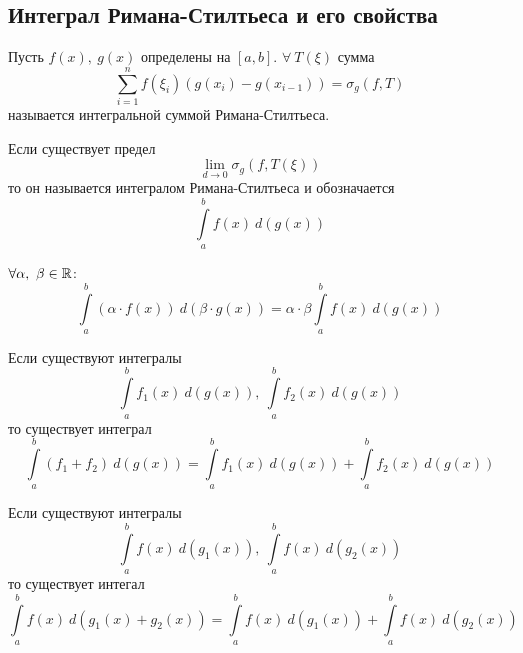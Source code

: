 \subsection{Интеграл Римана-Стилтьеса и его свойства}
\begin{definition}
    Пусть $f(x),\ g(x)$ определены на $[a,b]$. $\forall\ T(\xi)$ сумма 
    \[\sum\limits_{i=1}^{n} f(\xi_i)(g(x_i)-g(x_{i-1}))=\sigma_g(f,T)\]
    называется интегральной суммой Римана-Стилтьеса.
\end{definition} 
\begin{definition}
    Если существует предел
    \[\lim\limits_{d\to 0}\sigma_g(f, T(\xi))\]
    то он называется интегралом Римана-Стилтьеса и обозначается
    \[\int\limits_{a}^{b}f(x)\ d(g(x))\]
\end{definition}
\begin{numtheorem}
    $\forall \alpha,\ \beta\in \mathbb{R}$:
    \[\int\limits_{a}^{b}(\alpha\cdot f(x))\ d(\beta\cdot g(x))=\alpha \cdot \beta \int\limits_{a}^{b} f(x)\ d(g(x))\]
\end{numtheorem} 
\begin{numtheorem}
    Если существуют интегралы
    \[\int\limits_{a}^{b}f_1(x)\ d(g(x)),\ \int\limits_{a}^{b}f_2(x)\ d(g(x))\]
    то существует интеграл 
    \[\int\limits_{a}^{b}(f_1+f_2)\ d(g(x))=\int\limits_{a}^{b}f_1(x)\ d(g(x))+\int\limits_{a}^{b}f_2(x)\ d(g(x))\]
\end{numtheorem} 
\begin{numtheorem}
    Если существуют интегралы
    \[\int\limits_{a}^{b}f(x)\ d(g_1(x)),\ \int\limits_{a}^{b}f(x)\ d(g_2(x))\]
    то существует интегал 
    \[\int\limits_{a}^{b}f(x)\ d(g_1(x)+g_2(x))=\int\limits_{a}^{b}f(x)\ d(g_1(x))+\int\limits_{a}^{b}f(x)\ d(g_2(x))\]
\end{numtheorem} 
